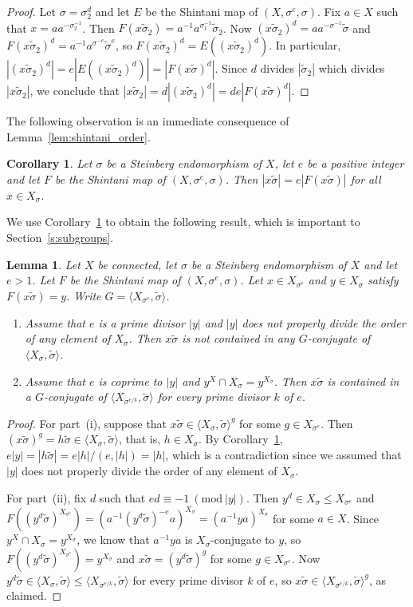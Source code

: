 \documentclass[11pt]{article}
\numberwithin{equation}{section}
\theoremstyle{shdefinition}
\theoremstyle{shplain}
\newtheorem{corollary}[definition]{Corollary}
\newtheorem{lemma}[definition]{Lemma}
\newcommand{\s}{\sigma}
\newcommand{\ws}{\widetilde{\sigma}}
\newcommand{\<}{\langle}
\renewcommand{\>}{\rangle}
\renewcommand{\leq}{\leqslant}
\renewcommand{\:}{\colon}
\renewcommand{\mod}[1]{\mathrm{ \ } (\mathrm{mod\ } #1)}
\begin{document}
\begin{proof}
Let $\s = \s_2^d$ and let $E$ be the Shintani map of $(X,\s^e,\s)$. Fix $a \in X$ such that $x = aa^{-\s_2^{-1}}$. Then $F(x\ws_2) = a^{-1}a^{\s_1^{-1}}\ws_2$. Now $(x\ws_2)^d = aa^{-\s^{-1}}\ws$ and $F(x\ws_2)^d = a^{-1}a^{\s^{-e}}\ws^e$, so $F(x\ws_2)^d = E((x\ws_2)^d)$. In particular, $|(x\ws_2)^d| = e|E((x\ws_2)^d)| = |F(x\ws)^d|$. Since $d$ divides $|\ws_2|$ which divides $|x\ws_2|$, we conclude that $|x\ws_2| = d|(x\ws_2)^d| = de|F(x\ws)^d|$.
\end{proof}

The following observation \cite[Lemma~3.20]{ref:BurnessGuralnickHarper} is an immediate consequence of Lemma~\ref{lem:shintani_order}.

\begin{corollary} \label{cor:shintani_order}
Let $\s$ be a Steinberg endomorphism of $X$, let $e$ be a positive integer and let $F$ be the Shintani map of $(X,\s^e,\s)$. Then $|x\ws| = e|F(x\ws)|$ for all $x \in X_{\s}$.
\end{corollary}

We use Corollary~\ref{cor:shintani_order} to obtain the following result, which is important to Section~\ref{s:subgroups}.

\begin{lemma} \label{lem:shintani_subfield}
Let $X$ be connected, let $\s$ be a Steinberg endomorphism of $X$ and let $e > 1$. Let $F$ be the Shintani map of $(X,\s^e,\s)$. Let $x \in X_{\s^e}$ and $y \in X_\s$ satisfy $F(x\ws) = y$. Write $G = \< X_{\s^e},\ws \>$. 
\begin{enumerate}
\item Assume that $e$ is a prime divisor $|y|$ and $|y|$ does not properly divide the order of any element of $X_\s$. Then $x\ws$ is not contained in any $G$-conjugate of $\< X_\s, \ws \>$.
\item Assume that $e$ is coprime to $|y|$ and $y^X \cap X_\s = y^{X_\s}$. Then $x\ws$ is contained in a $G$-conjugate of $\< X_{\s^{e/k}}, \ws \>$ for every prime divisor $k$ of $e$.
\end{enumerate}
\end{lemma}

\begin{proof}
For part~(i), suppose that $x\ws \in \< X_\s, \ws\>^g$ for some $g \in X_{\s^e}$. Then $(x\ws)^g = h\ws \in \< X_\s, \ws \>$, that is, $h \in X_\s$. By Corollary~\ref{cor:shintani_order}, $e|y| = |h\ws| = e|h|/(e,|h|) = |h|$, which is a contradiction since we assumed that $|y|$ does not properly divide the order of any element of $X_\s$.

For part~(ii), fix $d$ such that $ed \equiv -1 \mod{|y|}$. Then $y^d \in X_\s \leq X_{\s^e}$ and $F((y^d\ws)^{X_{\s^e}}) = (a^{-1}(y^d\ws)^{-e}a)^{X_\s} = (a^{-1}ya)^{X_\s}$ for some $a \in X$. Since $y^X \cap X_\s = y^{X_\s}$, we know that $a^{-1}ya$ is $X_\s$-conjugate to $y$, so $F((y^d\ws)^{X_{\s^e}}) = y^{X_\s}$ and $x\ws = (y^d\ws)^g$ for some $g \in X_{\s^e}$. Now $y^d\ws \in \< X_\s, \ws \> \leq \< X_{\s^{e/k}}, \ws\>$ for every prime divisor $k$ of $e$, so $x\ws \in \<X_{\s^{e/k}},\ws\>^g$, as claimed.
\end{proof}
\end{document}
